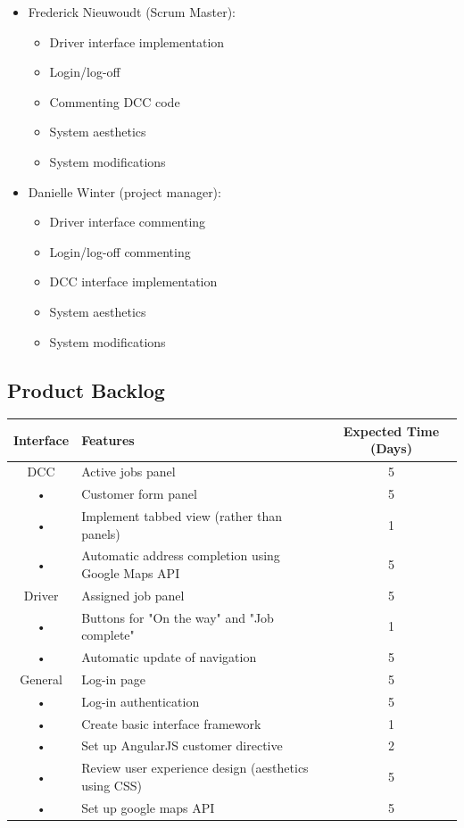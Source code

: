 \documentclass[12pt]{article}
\begin{document}
\begin{itemize}
\item Frederick Nieuwoudt (Scrum Master):
\begin{itemize}
\item Driver interface implementation
\item Login/log-off
\item Commenting DCC code
\item System aesthetics
\item System modifications
\end{itemize}
\item Danielle Winter (project manager):
\begin{itemize}
\item Driver interface commenting
\item Login/log-off commenting
\item DCC interface implementation
\item System aesthetics
\item System modifications
\end{itemize}
\end{itemize}

\subsection{Product Backlog}
\begin{tabular}{|c|l|c|}
\hline 
Interface & Features & Expected Time (Days)\\ 
\hline 
DCC & Active jobs panel & 5\\ 
• & Customer form panel & 5\\ 
• & Implement tabbed view (rather than panels) & 1 \\
• & Automatic address completion using Google Maps API & 5\\

\hline 
Driver & Assigned job panel & 5\\
• & Buttons for "On the way" and "Job complete" & 1\\ 
• & Automatic update of navigation & 5\\
\hline 
General & Log-in page & 5\\ 
• & Log-in authentication & 5\\
• & Create basic interface framework & 1\\
• & Set up AngularJS customer directive & 2\\
• & Review user experience design (aesthetics using CSS) & 5\\
• & Set up google maps API & 5\\
\hline
\end{tabular} 
\end{document}
